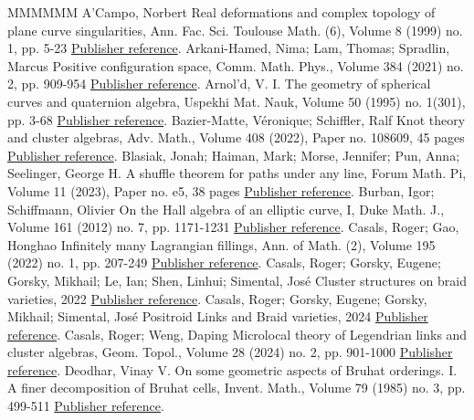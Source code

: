 \begin{thebibliography}{MMMMMM}
 A’Campo, Norbert Real deformations and complex topology of plane curve singularities, Ann. Fac. Sci. Toulouse Math. (6), Volume 8 (1999) no. 1, pp. 5-23 \href{https://alco.centre-mersenne.org/articles/10.5802/alco.345/#ACampo}{Publisher reference}.
 Arkani-Hamed, Nima; Lam, Thomas; Spradlin, Marcus Positive configuration space, Comm. Math. Phys., Volume 384 (2021) no. 2, pp. 909-954 \href{https://alco.centre-mersenne.org/articles/10.5802/alco.345/#ALS}{Publisher reference}.
 Arnol’d, V. I. The geometry of spherical curves and quaternion algebra, Uspekhi Mat. Nauk, Volume 50 (1995) no. 1(301), pp. 3-68 \href{https://alco.centre-mersenne.org/articles/10.5802/alco.345/#Arnold}{Publisher reference}.
 Bazier-Matte, Véronique; Schiffler, Ralf Knot theory and cluster algebras, Adv. Math., Volume 408 (2022), Paper no. 108609, 45 pages \href{https://alco.centre-mersenne.org/articles/10.5802/alco.345/#BMS}{Publisher reference}.
 Blasiak, Jonah; Haiman, Mark; Morse, Jennifer; Pun, Anna; Seelinger, George H. A shuffle theorem for paths under any line, Forum Math. Pi, Volume 11 (2023), Paper no. e5, 38 pages \href{https://alco.centre-mersenne.org/articles/10.5802/alco.345/#BHMPS}{Publisher reference}.
 Burban, Igor; Schiffmann, Olivier On the Hall algebra of an elliptic curve, I, Duke Math. J., Volume 161 (2012) no. 7, pp. 1171-1231 \href{https://alco.centre-mersenne.org/articles/10.5802/alco.345/#BuSc}{Publisher reference}.
 Casals, Roger; Gao, Honghao Infinitely many Lagrangian fillings, Ann. of Math. (2), Volume 195 (2022) no. 1, pp. 207-249 \href{https://alco.centre-mersenne.org/articles/10.5802/alco.345/#CG}{Publisher reference}.
 Casals, Roger; Gorsky, Eugene; Gorsky, Mikhail; Le, Ian; Shen, Linhui; Simental, José Cluster structures on braid varieties, 2022 \href{https://alco.centre-mersenne.org/articles/10.5802/alco.345/#CGGLSS}{Publisher reference}.
 Casals, Roger; Gorsky, Eugene; Gorsky, Mikhail; Simental, José Positroid Links and Braid varieties, 2024 \href{https://alco.centre-mersenne.org/articles/10.5802/alco.345/#CGGS}{Publisher reference}.
 Casals, Roger; Weng, Daping Microlocal theory of Legendrian links and cluster algebras, Geom. Topol., Volume 28 (2024) no. 2, pp. 901-1000 \href{https://alco.centre-mersenne.org/articles/10.5802/alco.345/#CW}{Publisher reference}.
 Deodhar, Vinay V. On some geometric aspects of Bruhat orderings. I. A finer decomposition of Bruhat cells, Invent. Math., Volume 79 (1985) no. 3, pp. 499-511 \href{https://alco.centre-mersenne.org/articles/10.5802/alco.345/#Deodhar}{Publisher reference}.

\end{thebibliography}
